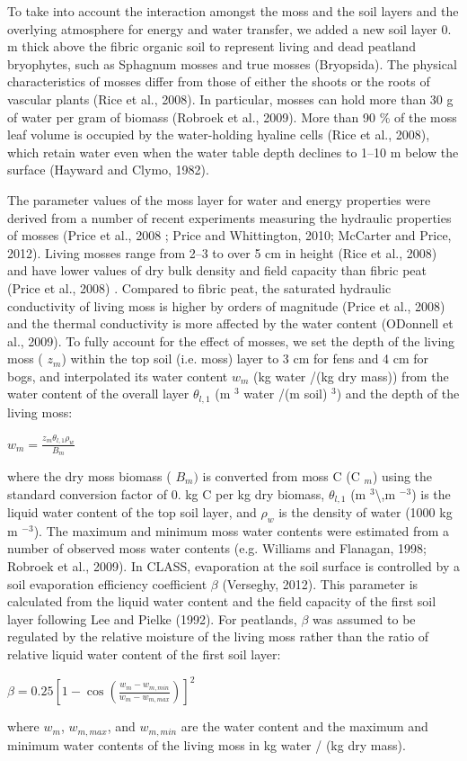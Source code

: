 To take into account the interaction amongst the moss and the soil layers and the overlying atmosphere for energy and water transfer, we added a new soil layer 0. m thick above the fibric organic soil to represent living and dead peatland bryophytes, such as Sphagnum mosses and true mosses (Bryopsida). The physical characteristics of mosses differ from those of either the shoots or the roots of vascular plants (Rice et al., 2008). In particular, mosses can hold more than 30 g of water per gram of biomass (Robroek et al., 2009). More than 90 \% of the moss leaf volume is occupied by the water-\/holding hyaline cells (Rice et al., 2008), which retain water even when the water table depth declines to 1--10 m below the surface (Hayward and Clymo, 1982).

The parameter values of the moss layer for water and energy properties were derived from a number of recent experiments measuring the hydraulic properties of mosses (Price et al., 2008 \cite{Price2008-fr}; Price and Whittington, 2010; Mc\+Carter and Price, 2012). Living mosses range from 2--3 to over 5 cm in height (Rice et al., 2008) and have lower values of dry bulk density and field capacity than fibric peat (Price et al., 2008) \cite{Price2008-fr}. Compared to fibric peat, the saturated hydraulic conductivity of living moss is higher by orders of magnitude (Price et al., 2008) \cite{Price2008-fr} and the thermal conductivity is more affected by the water content (O\textquotesingle{}Donnell et al., 2009). To fully account for the effect of mosses, we set the depth of the living moss ( $z_{m}$) within the top soil (i.\+e. moss) layer to 3 cm for fens and 4 cm for bogs, and interpolated its water content $w_m$ (kg water /(kg dry mass)) from the water content of the overall layer $\theta_{l,1}$ (m $^3$ water /(m soil) $^3$) and the depth of the living moss\+:

$w_m =\frac{z_m\theta_{l,1}\rho_w}{B_m} $

where the dry moss biomass ( $B_m) $ is converted from moss C (C $_m $) using the standard conversion factor of 0. kg C per kg dry biomass, $\theta _{l,1} $ (m $^3$\textbackslash{},m $^{-3}$) is the liquid water content of the top soil layer, and $\rho_w $ is the density of water (1000 kg m $^{-3} $). The maximum and minimum moss water contents were estimated from a number of observed moss water contents (e.\+g. Williams and Flanagan, 1998; Robroek et al., 2009). In C\+L\+A\+S\+S, evaporation at the soil surface is controlled by a soil evaporation efficiency coefficient $\beta $ (Verseghy, 2012). This parameter is calculated from the liquid water content and the field capacity of the first soil layer following Lee and Pielke (1992). For peatlands, $\beta $ was assumed to be regulated by the relative moisture of the living moss rather than the ratio of relative liquid water content of the first soil layer\+:

$ \beta = 0.25 [ 1- \cos \left( \frac{w_m -w_{m,min}}{w_m-w_{m,max}} \right)]^{2} $

where $w_m $, $w_{m,max} $, and $w_{m,min} $ are the water content and the maximum and minimum water contents of the living moss in kg water / (kg dry mass). 